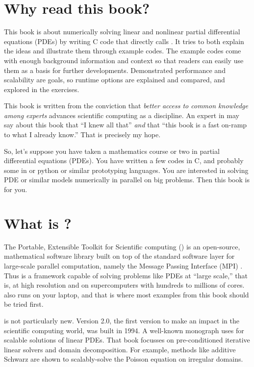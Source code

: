 
\section{Why read this book?}

This book is about numerically solving linear and nonlinear partial differential equations (PDEs) by writing C code \citep{KernighanRitchie1988} that directly calls \PETSc.  It tries to both explain the ideas and illustrate them through example codes.  The example codes come with enough background information and context so that readers can easily use them as a basis for further developments.  Demonstrated performance and scalability are goals, so runtime options are explained and compared, and explored in the exercises.

This book is written from the conviction that \emph{better access to common knowledge among experts} advances scientific computing as a discipline.  An expert in \PETSc may say about this book that ``I knew all that'' \emph{and} that ``this book is a fast on-ramp to what I already know.''  That is precisely my hope.

So, let's suppose you have taken a mathematics course or two in partial differential equations (PDEs).  You have written a few codes in C, and probably some in \Matlab or python or similar prototyping languages.  You are interested in solving PDE or similar models numerically in parallel on big problems.  Then this book is for you.

\section{What is \PETSc?}

The Portable, Extensible Toolkit for Scientific computing (\PETSc) is an open-source, mathematical software library built on top of the standard software layer for large-scale parallel computation, namely the Message Passing Interface (MPI) \citep{Groppetal1999}.  Thus \PETSc is a framework capable of solving problems like PDEs at ``large scale,'' that is, at high resolution and on supercomputers with hundreds to millions of cores.  \PETSc also runs on your laptop, and that is where most examples from this book should be tried first.

\PETSc is not particularly new.  Version 2.0, the first version to make an impact in the scientific computing world, was built in 1994.  A well-known monograph \citet{Smithetal1996} uses  for scalable solutions of linear PDEs.  That book focusses on pre-conditioned iterative linear solvers and domain decomposition.  For example, methods like additive Schwarz are shown to scalably-solve the Poisson equation on irregular domains.

